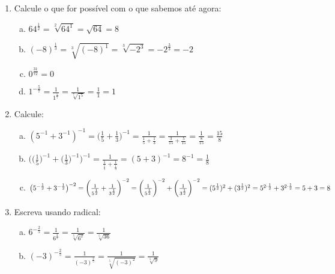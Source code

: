 \documentclass[a4paper,14pt]{article}
\begin{document}
\begin{multicols}{2}
\begin{enumerate}
\begin{enumerate}[a)]
        \end{enumerate}
        \item Calcule o que for possível com o que sabemos até agora:
        \begin{enumerate}[a)] 
        	\item $64^\frac{1}{2} = \sqrt[2]{64^1} = \sqrt{64} = 8$ \\
        	\item $(-8)^\frac{1}{3} = \sqrt[3]{(-8)^1} = \sqrt[3]{-2^3} = -2^\frac{3}{3} = -2$ \\
        	\item $0^\frac{31}{72} = 0$ \\
        	\item $1^{-\frac{5}{7}} = \frac{1}{1^\frac{5}{7}} = \frac{1}{\sqrt[7]{1^5}} = \frac{1}{1} = 1$ \\
        \end{enumerate}
        \item Calcule:
        \begin{enumerate}[a)]
        	\item $(5^{-1} + 3^{-1})^{-1} = \bigg(\frac{1}{5} + \frac{1}{3}\bigg)^{-1} = \frac{1}{\frac{1}{5}+\frac{1}{3}} = \frac{1}{\frac{3}{15}+\frac{5}{15}} = \frac{1}{\frac{8}{15}} = \frac{15}{8}$ \\
        	\item $\bigg(\bigg(\frac{1}{5}\bigg)^{-1} + \bigg(\frac{1}{3}\bigg)^{-1}\bigg)^{-1} = \frac{1}{\frac{1}{\frac{1}{5}}+\frac{1}{\frac{1}{3}}} = (5 + 3)^{-1} = 8^{-1} =  \frac{1}{8}$ \\
        	\item $\big(5^{-\frac{1}{2}} + 3^{-\frac{1}{2}}\big)^{-2} = \\ \bigg(\frac{1}{5^\frac{1}{2}} + \frac{1}{3^\frac{1}{2}}\bigg)^{-2} = \bigg(\frac{1}{5^\frac{1}{2}}\bigg)^{-2} + \bigg(\frac{1}{3^\frac{1}{2}}\bigg)^{-2} = (5^\frac{1}{2})^2 + (3^\frac{1}{2})^2 = 5^{2 \cdot \frac{1}{2}} + 3^{2 \cdot \frac{1}{2}} = 5 + 3 = 8$
        \end{enumerate}
            \item Escreva usando radical:
        \begin{enumerate}[a)]
        	\item $6^{-\frac{2}{5}} = \frac{1}{6^\frac{2}{5}} = \frac{1}{\sqrt[5]{6^2}} = \frac{1}{\sqrt[5]{36}}$ \\
        	\item $(-3)^{-\frac{2}{5}} = \frac{1}{(-3)^\frac{2}{5}} = \frac{1}{\sqrt[5]{(-3)^2}} = \frac{1}{\sqrt[5]{9}}$ \\

\end{enumerate}
\end{enumerate}
\end{multicols}
\end{document}
